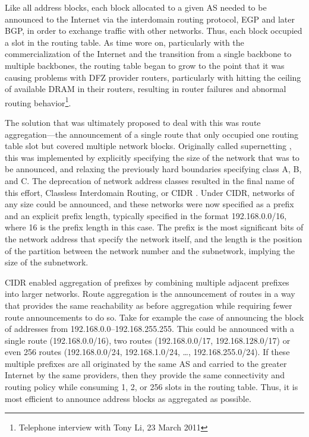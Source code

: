 Like all address blocks, each block allocated to a given AS needed to be
announced to the Internet via the interdomain routing protocol, EGP and later
BGP, in order to exchange traffic with other networks. Thus, each block
occupied a slot in the routing table. As time wore on, particularly with the
commercialization of the Internet and the transition from a single backbone to
multiple backbones, the routing table began to grow to the point that it was
causing problems with DFZ provider routers, particularly with hitting the
ceiling of available DRAM in their routers, resulting in router failures and
abnormal routing behavior\footnote{Telephone interview with Tony Li, 23 March
2011}.

%

The solution that was ultimately proposed to deal with this was route
aggregation---the announcement of a single route that only occupied one routing
table slot but covered multiple network blocks. Originally called supernetting
\cite{rfc1338}, this was implemented by explicitly specifying the size of the
network that was to be announced, and relaxing the previously hard boundaries
specifying class A, B, and C. The deprecation of network address classes
resulted in the final name of this effort, Classless Interdomain Routing, or
CIDR \cite{rfc1519}. Under CIDR, networks of any size could be announced, and
these networks were now specified as a prefix and an explicit prefix length,
typically specified in the format 192.168.0.0/16, where 16 is the prefix length
in this case. The prefix is the most significant bits of the network address
that specify the network itself, and the length is the position of the
partition between the network number and the subnetwork, implying the size of
the subnetwork.

CIDR enabled aggregation of prefixes by combining multiple adjacent prefixes
into larger networks. Route aggregation is the announcement of routes in a way
that provides the same reachability as before aggregation while requiring fewer
route announcements to do so. Take for example the case of announcing the block
of addresses from 192.168.0.0--192.168.255.255. This could be announced with a
single route (192.168.0.0/16), two routes (192.168.0.0/17, 192.168.128.0/17) or
even 256 routes (192.168.0.0/24, 192.168.1.0/24, \ldots, 192.168.255.0/24). If
these multiple prefixes are all originated by the same AS and carried to the
greater Internet by the same providers, then they provide the same connectivity
and routing policy while consuming 1, 2, or 256 slots in the routing table.
Thus, it is most efficient to announce address blocks as aggregated as
possible.

